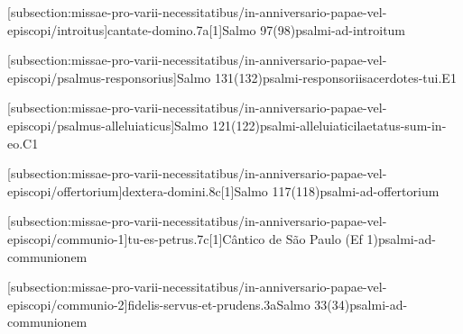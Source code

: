 \def\Prefix{subsection:missae-pro-varii-necessitatibus/in-anniversario-papae-vel-episcopi}

[\Prefix/introitus]{cantate-domino.7a}[1]{Salmo 97(98)}{psalmi-ad-introitum}

[\Prefix/psalmus-responsorius]{Salmo 131(132)}{psalmi-responsorii}{sacerdotes-tui.E1}

\AllowPageFlush

[\Prefix/psalmus-alleluiaticus]{Salmo 121(122)}{psalmi-alleluiatici}{laetatus-sum-in-eo.C1}

\AllowPageFlush

[\Prefix/offertorium]{dextera-domini.8c}[1]{Salmo 117(118)}{psalmi-ad-offertorium}

\AllowPageFlush

[\Prefix/communio-1]{tu-es-petrus.7c}[1]{Cântico de São Paulo (Ef 1)}{psalmi-ad-communionem}

\AllowPageFlush

[\Prefix/communio-2]{fidelis-servus-et-prudens.3a}{Salmo 33(34)}{psalmi-ad-communionem}